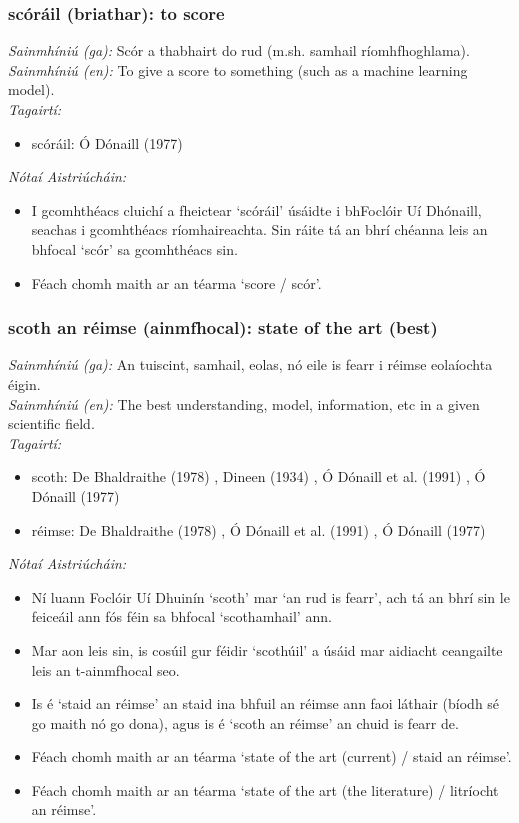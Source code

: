 \subsubsection*{scóráil (briathar): to score}
 \noindent \textit{Sainmhíniú (ga):} Scór a thabhairt do rud (m.sh. samhail ríomhfhoghlama).
\\
 \noindent \textit{Sainmhíniú (en):} To give a score to something (such as a machine learning model).
\\
 \noindent \textit{Tagairtí:}
\begin{itemize}
	\item scóráil: Ó Dónaill (1977) \cite{odonaill}
\end{itemize}

 \noindent \textit{Nótaí Aistriúcháin:}
\begin{itemize}
	\item I gcomhthéacs cluichí a fheictear `scóráil' úsáidte i bhFoclóir Uí Dhónaill, seachas i gcomhthéacs ríomhaireachta. Sin ráite tá an bhrí chéanna leis an bhfocal `scór' sa gcomhthéacs sin.
	\item Féach chomh maith ar an téarma `score / scór'.
\end{itemize}


\subsubsection*{scoth an réimse (ainmfhocal): state of the art (best)}
 \noindent \textit{Sainmhíniú (ga):} An tuiscint, samhail, eolas, nó eile is fearr i réimse eolaíochta éigin.
\\
 \noindent \textit{Sainmhíniú (en):} The best understanding, model, information, etc in a given scientific field.
\\
 \noindent \textit{Tagairtí:}
\begin{itemize}
	\item scoth: De Bhaldraithe (1978) \cite{de-bhaldraithe}, Dineen (1934) \cite{dineen}, Ó Dónaill et al. (1991) \cite{focloir-beag}, Ó Dónaill (1977) \cite{odonaill}
	\item réimse: De Bhaldraithe (1978) \cite{de-bhaldraithe}, Ó Dónaill et al. (1991) \cite{focloir-beag}, Ó Dónaill (1977) \cite{odonaill}
\end{itemize}

 \noindent \textit{Nótaí Aistriúcháin:}
\begin{itemize}
	\item Ní luann Foclóir Uí Dhuinín `scoth' mar `an rud is fearr', ach tá an bhrí sin le feiceáil ann fós féin sa bhfocal `scothamhail' ann.
	\item Mar aon leis sin, is cosúil gur féidir `scothúil' a úsáid mar aidiacht ceangailte leis an t-ainmfhocal seo.
	\item Is é `staid an réimse' an staid ina bhfuil an réimse ann faoi láthair (bíodh sé go maith nó go dona), agus is é `scoth an réimse' an chuid is fearr de.
	\item Féach chomh maith ar an téarma `state of the art (current) / staid an réimse'.
	\item Féach chomh maith ar an téarma `state of the art (the literature) / litríocht an réimse'.
\end{itemize}


